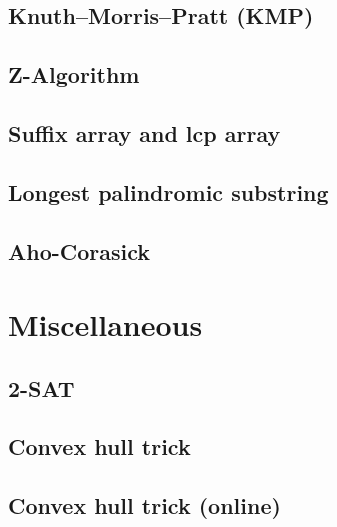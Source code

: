 \documentclass[9pt]{extarticle}
\begin{document}
\begin{multicols*}{3}
\subsection{Knuth--Morris--Pratt (KMP)}


\subsection{Z-Algorithm}


\subsection{Suffix array and lcp array}


\subsection{Longest palindromic substring} %


\subsection{Aho-Corasick}


\section{Miscellaneous}

\subsection{2-SAT} %


\subsection{Convex hull trick} %


\subsection{Convex hull trick (online)}



\end{multicols*}
\end{document}
